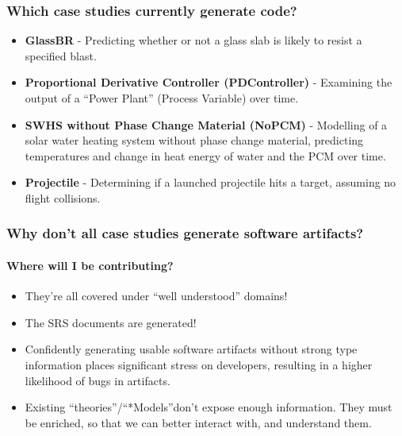 \documentclass{beamer}
\begin{document}
\begin{frame}
    \frametitle{Which case studies currently generate code?}

    \begin{itemize}
        \item<2-> \textbf{GlassBR} - Predicting whether or not a glass slab is likely to resist a specified blast.
        \item<3-> \textbf{Proportional Derivative Controller (PDController)} - Examining the output of a ``Power Plant'' (Process Variable) over time.
        \item<4-> \textbf{SWHS without Phase Change Material (NoPCM)} - Modelling of a solar water heating system without phase change material, predicting temperatures and change in heat energy of water and the PCM over time.
        \item<5-> \textbf{Projectile} - Determining if a launched projectile hits a target, assuming no flight collisions.
    \end{itemize}
\end{frame}

\begin{frame}
    \frametitle{Why don't all case studies generate software artifacts?}
    \framesubtitle{Where will I be contributing?}

    \begin{itemize}
        \item<3-> They're all covered under ``well understood'' domains!
        \item<4-> The SRS documents are generated!\\
    \end{itemize}


    \begin{itemize}
        \item<7-> Confidently generating usable software artifacts without strong type information places significant stress on developers, resulting in a higher likelihood of bugs in artifacts.
        \item<8-> Existing ``theories''/``*Models''\footnotemark[1] don't expose enough information. They must be enriched, so that we can better interact with, and understand them.
    \end{itemize}

\end{frame}
\end{document}
